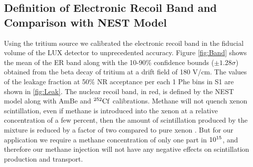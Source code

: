 \subsection{Definition of Electronic Recoil Band and Comparison with NEST Model}

Using the tritium source we calibrated the electronic recoil band in the fiducial volume of the LUX detector to unprecedented accuracy. Figure \ref{fig:Band} shows the mean of the ER band along with the 10-90\% confidence bounds ($\pm 1.28\sigma$) obtained from the beta decay of tritium at a drift field of 180 V/cm. The values of the leakage fraction at 50\% NR acceptance per each 1 Phe bins in S1 are shown in \ref{fig:Leak}. The nuclear recoil band, in red, is defined by the NEST model along with AmBe and $\rm^{252}Cf$  calibrations. Methane will not quench xenon scintillation,  even if methane is introduced into the xenon at a relative concentration of a few percent, then the amount of scintillation produced by the mixture is reduced by a factor of two compared to pure xenon \cite{Kirill_Methane}. But for our application we require a methane concentration of only one part in $\rm10^{15}$, and therefore our methane injection will not have any negative effects on scintillation production and transport.

